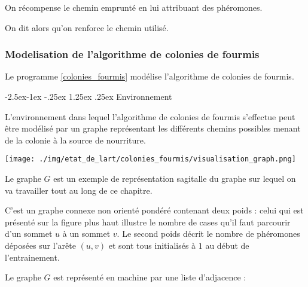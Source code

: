 \documentclass[
12pt,
french,
]{article}
\makeatletter
\let\origfigure\figure
\let\endorigfigure\endfigure
\renewenvironment{figure}[1][2] {
  \expandafter\origfigure\expandafter[H]
} {
  \endorigfigure
}
\renewcommand\paragraph{\@startsection{paragraph}{4}{\z@}%
        {-2.5ex\@plus -1ex \@minus -.25ex}%
        {1.25ex \@plus .25ex}%
        {\normalfont\normalsize\bfseries}}
\makeatother
\begin{document}
On récompense le chemin emprunté en lui attribuant des phéromones.

On dit alors qu'on renforce le chemin utilisé.

\hypertarget{modelisation-de-lalgorithme-de-colonies-de-fourmis}{%
\subsubsection{Modelisation de l'algorithme de colonies de
fourmis}\label{modelisation-de-lalgorithme-de-colonies-de-fourmis}}

Le programme \ref{colonies_fourmis} modélise l'algorithme de colonies de
fourmis.

\hypertarget{environnement}{%
\paragraph{Environnement}\label{environnement}}

L'environnement dans lequel l'algorithme de colonies de fourmis
s'effectue peut être modélisé par un graphe représentant les différents
chemins possibles menant de la colonie à la source de nourriture.

\begin{figure}
\centering
\texttt{[image: ./img/etat\_de\_lart/colonies\_fourmis/visualisation\_graph.png]}
\caption{Représentation sagitalle du graphe G}
\end{figure}

Le graphe \(G\) est un exemple de représentation sagitalle du graphe sur
lequel on va travailler tout au long de ce chapitre.

C'est un graphe connexe non orienté pondéré contenant deux poids : celui
qui est présenté sur la figure plus haut illustre le nombre de cases
qu'il faut parcourir d'un sommet \(u\) à un sommet \(v\). Le second
poids décrit le nombre de phéromones déposées sur l'arête \((u,v)\) et
sont tous initialisés à \(1\) au début de l'entrainement.

Le graphe \(G\) est représenté en machine par une liste d'adjacence :
\end{document}
